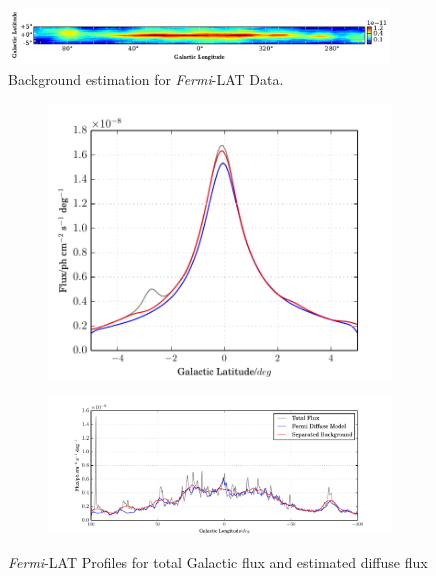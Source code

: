 \documentclass{PoS}
\begin{document}
\begin{figure}
  \begin{center}
      \includegraphics[width=0.9\textwidth]{figures/BG_DATA.pdf}
  \caption{Background estimation for \textit{Fermi}-LAT Data.}
  \end{center}
  \vspace{-15pt}
\end{figure}

\begin{figure}
\centering
\begin{subfigure}{0.3\textwidth}
      \includegraphics[width=\textwidth]{figures/GLAT.pdf}
\end{subfigure}
\begin{subfigure}{0.6\textwidth}
        \includegraphics[width=\textwidth]{figures/GLON.pdf}
\end{subfigure}
\caption{\textit{Fermi}-LAT Profiles for total Galactic flux and estimated diffuse flux}
  \vspace{-15pt}
\end{figure}
\end{document}
